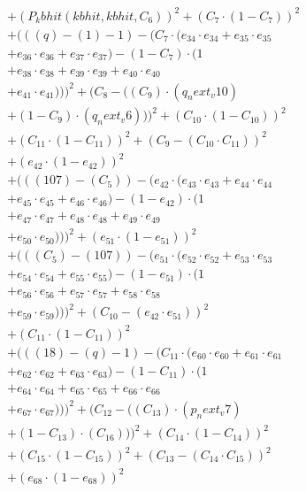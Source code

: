 \documentclass[10pt, a4paper]{article}
\begin{document}
\begin{align*}
& + (P_kbhit(kbhit, kbhit, C_{6}))^{2} + (C_{7} \cdot (1 - C_{7}))^{2} \\
& + (((q) - (1) - 1) - (C_{7} \cdot (e_{34} \cdot e_{34} + e_{35} \cdot e_{35} \\
& + e_{36} \cdot e_{36} + e_{37} \cdot e_{37}) - (1 - C_{7}) \cdot (1 \\
& + e_{38} \cdot e_{38} + e_{39} \cdot e_{39} + e_{40} \cdot e_{40} \\
& + e_{41} \cdot e_{41})))^{2} + (C_{8} - ((C_{9})  \cdot  (q_next_v10) \\
& + (1 - C_{9})  \cdot  (q_next_v6)))^{2} + (C_{10} \cdot (1 - C_{10}))^{2} \\
& + (C_{11} \cdot (1 - C_{11}))^{2} + (C_{9} - (C_{10} \cdot C_{11}))^{2} \\
& + (e_{42} \cdot (1 - e_{42}))^{2} \\
& + (((107) - (C_{5})) - (e_{42} \cdot (e_{43} \cdot e_{43} + e_{44} \cdot e_{44} \\
& + e_{45} \cdot e_{45} + e_{46} \cdot e_{46}) - (1 - e_{42}) \cdot (1 \\
& + e_{47} \cdot e_{47} + e_{48} \cdot e_{48} + e_{49} \cdot e_{49} \\
& + e_{50} \cdot e_{50})))^{2} + (e_{51} \cdot (1 - e_{51}))^{2} \\
& + (((C_{5}) - (107)) - (e_{51} \cdot (e_{52} \cdot e_{52} + e_{53} \cdot e_{53} \\
& + e_{54} \cdot e_{54} + e_{55} \cdot e_{55}) - (1 - e_{51}) \cdot (1 \\
& + e_{56} \cdot e_{56} + e_{57} \cdot e_{57} + e_{58} \cdot e_{58} \\
& + e_{59} \cdot e_{59})))^{2} + (C_{10} - (e_{42} \cdot e_{51}))^{2} \\
& + (C_{11} \cdot (1 - C_{11}))^{2} \\
& + (((18) - (q) - 1) - (C_{11} \cdot (e_{60} \cdot e_{60} + e_{61} \cdot e_{61} \\
& + e_{62} \cdot e_{62} + e_{63} \cdot e_{63}) - (1 - C_{11}) \cdot (1 \\
& + e_{64} \cdot e_{64} + e_{65} \cdot e_{65} + e_{66} \cdot e_{66} \\
& + e_{67} \cdot e_{67})))^{2} + (C_{12} - ((C_{13})  \cdot  (p_next_v7) \\
& + (1 - C_{13})  \cdot  (C_{16})))^{2} + (C_{14} \cdot (1 - C_{14}))^{2} \\
& + (C_{15} \cdot (1 - C_{15}))^{2} + (C_{13} - (C_{14} \cdot C_{15}))^{2} \\
& + (e_{68} \cdot (1 - e_{68}))^{2} \\

\end{align*}
\end{document}
